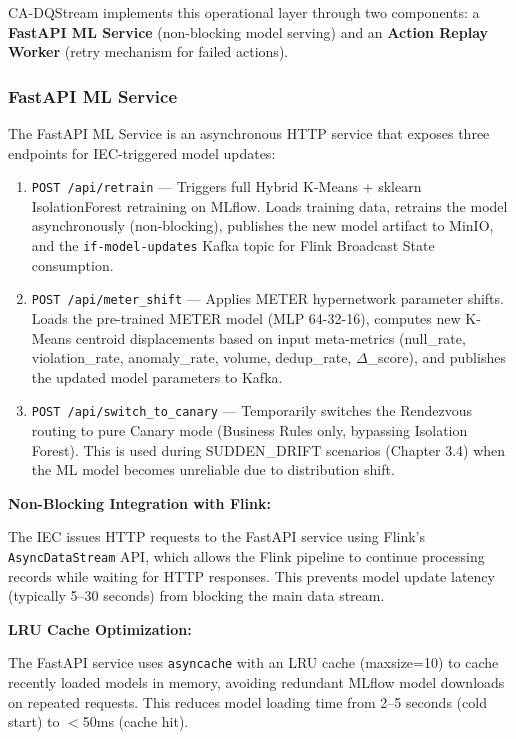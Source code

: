 CA-DQStream implements this operational layer through two components: a \textbf{FastAPI ML Service} (non-blocking model serving) and an \textbf{Action Replay Worker} (retry mechanism for failed actions).

\subsubsection{FastAPI ML Service}

The FastAPI ML Service is an asynchronous HTTP service that exposes three endpoints for IEC-triggered model updates:

\begin{enumerate}
    \item \texttt{POST /api/retrain} --- Triggers full Hybrid K-Means + sklearn IsolationForest retraining on MLflow. Loads training data, retrains the model asynchronously (non-blocking), publishes the new model artifact to MinIO, and the \texttt{if-model-updates} Kafka topic for Flink Broadcast State consumption.

    \item \texttt{POST /api/meter\_shift} --- Applies METER hypernetwork parameter shifts. Loads the pre-trained METER model (MLP 64-32-16), computes new K-Means centroid displacements based on input meta-metrics (null\_rate, violation\_rate, anomaly\_rate, volume, dedup\_rate, $\Delta$\_score), and publishes the updated model parameters to Kafka.

    \item \texttt{POST /api/switch\_to\_canary} --- Temporarily switches the Rendezvous routing to pure Canary mode (Business Rules only, bypassing Isolation Forest). This is used during SUDDEN\_DRIFT scenarios (Chapter 3.4) when the ML model becomes unreliable due to distribution shift.
\end{enumerate}

\textbf{Non-Blocking Integration with Flink:}

The IEC issues HTTP requests to the FastAPI service using Flink's \texttt{AsyncDataStream} API, which allows the Flink pipeline to continue processing records while waiting for HTTP responses. This prevents model update latency (typically 5--30 seconds) from blocking the main data stream.

\textbf{LRU Cache Optimization:}

The FastAPI service uses \texttt{asyncache} with an LRU cache (maxsize=10) to cache recently loaded models in memory, avoiding redundant MLflow model downloads on repeated requests. This reduces model loading time from 2--5 seconds (cold start) to $<$50ms (cache hit).

